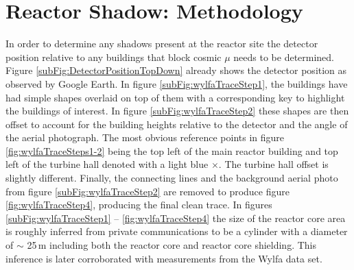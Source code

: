 \section{Reactor Shadow: Methodology} \label{sec:ReactorShadowMethodology}
In order to determine any shadows present at the reactor site the detector position relative to any buildings that block cosmic $\mu$ needs to be determined. Figure \ref{subFig:DetectorPositionTopDown} already shows the detector position as observed by Google Earth. In figure \ref{subFig:wylfaTraceStep1}, the buildings have had simple shapes overlaid on top of them with a corresponding key to highlight the buildings of interest. In figure \ref{subFig:wylfaTraceStep2} these shapes are then offset to account for the building heights relative to the detector and the angle of the aerial photograph. The most obvious reference points in figure \ref{fig:wylfaTraceSteps1-2} being the top left of the main reactor building and top left of the turbine hall denoted with a light blue $\times$. The turbine hall offset is slightly different. Finally, the connecting lines and the background aerial photo from figure \ref{subFig:wylfaTraceStep2} are removed to produce figure \ref{fig:wylfaTraceStep4}, producing the final clean trace. In figures \ref{subFig:wylfaTraceStep1}  -- \ref{fig:wylfaTraceStep4} the size of the reactor core area is roughly inferred from private communications to be a cylinder with a diameter of $\sim$ 25\,m including both the reactor core and reactor core shielding. This inference is later corroborated with measurements from the Wylfa data set. 


